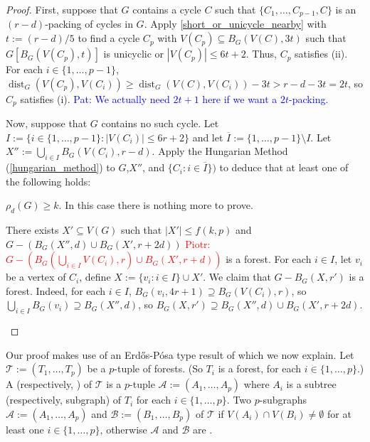 \documentclass{patmorin}
\newcommand{\pat}[1]{\textcolor{Blue}{Pat: #1}}
\newcommand{\piotr}[1]{\textcolor{red}{Piotr: #1}}
\DeclareMathOperator{\dist}{dist}
\begin{document}
\begin{proof}
  First, suppose that $G$ contains a cycle $C$ such that $\{C_1,\ldots,C_{p-1},C\}$ is an $(r-d)$-packing of cycles in $G$.  Apply \cref{short_or_unicycle_nearby} with $t:=(r-d)/5$ to find a cycle $C_p$ with $V(C_p)\subseteq B_G(V(C),3t)$ such that $G[B_G(V(C_p),t)]$ is unicyclic or $|V(C_p)|\le 6t+2$.  Thus, $C_p$ satisfies (ii).  For each $i\in\{1,\ldots,p-1\}$, $\dist_G(V(C_p),V(C_i))\ge \dist_G(V(C),V(C_i))-3t > r-d - 3t = 2t$, so $C_p$ satisfies (i). \pat{We actually need $2t+1$ here if we want a $2t$-packing.}

  Now, suppose that $G$ contains no such cycle.  Let $I:=\{i\in\{1,\ldots,p-1\}:|V(C_i)|\le 6r+2\}$ and let $\overline{I}:=\{1,\ldots,p-1\}\setminus I$.
  Let $X'':=\bigcup_{i\in I}B_G(V(C_i),r-d)$.  Apply the Hungarian Method (\cref{hungarian_method}) to $G$,$X''$, and $\{C_i:i\in\overline{I}\})$ to deduce that at least one of the following holds:
  \begin{compactenum}[(a)]\setcounter{enumi}{1}
    \item $\rho_d(G)\ge k$.  In this case there is nothing more to prove.
    \item There exists $X'\subseteq V(G)$ such that $|X'|\le f(k,p)$ and $G-(B_G(X'',d)\cup B_{G}(X',r+2d))$
    \piotr{$G-(B_G(\bigcup_{i\in I} V(C_i),r)\cup B_{G}(X',r+d))$} is a forest. For each $i\in I$, let $v_i$ be a vertex of $C_i$, define $X:=\{v_i:i\in I\}\cup X'$.  We claim that $G-B_G(X,r')$ is a forest.  Indeed, for each $i\in I$, $B_G(v_i,4r+1)\supseteq B_G(V(C_i),r)$, so $\bigcup_{i\in I}B_G(v_i)\supseteq B_G(X'',d)$, so $B_G(X,r')\supseteq B_G(X'',d)\cup B_{G}(X',r+2d)$. \qedhere
  \end{compactenum}
\end{proof}




Our proof makes use of an Erd\H{o}s-P\'osa type result of \citet{gyarfas.lehel:helly} which we now explain.  Let $\mathcal{T}:=(T_1,\ldots,T_p)$ be a $p$-tuple of forests.  (So $T_i$ is a forest, for each $i\in\{1,\ldots,p\}$.)  A  (respectively, ) of $\mathcal{T}$ is a $p$-tuple $\mathcal{A}:=(A_1,\ldots,A_p)$ where $A_i$ is a subtree (respectively, subgraph) of $T_i$ for each $i\in\{1,\ldots,p\}$.  Two $p$-subgraphs $\mathcal{A}:=(A_1,\ldots,A_p)$ and $\mathcal{B}:=(B_1,\ldots,B_p)$ of $\mathcal{T}$  if $V(A_i)\cap V(B_i)\neq\emptyset$ for at least one $i\in\{1,\ldots,p\}$, otherwise $\mathcal{A}$ and $\mathcal{B}$ are .
\end{document}
